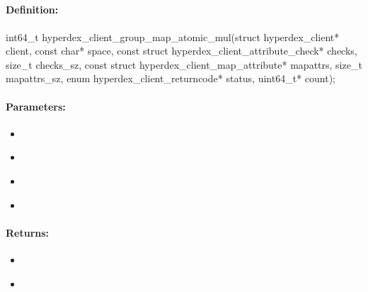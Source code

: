 \pagebreak
\subsection{}
\label{api:c:group_map_atomic_mul}


\paragraph{Definition:}
\begin{ccode}
int64_t hyperdex_client_group_map_atomic_mul(struct hyperdex_client* client,
        const char* space,
        const struct hyperdex_client_attribute_check* checks, size_t checks_sz,
        const struct hyperdex_client_map_attribute* mapattrs, size_t mapattrs_sz,
        enum hyperdex_client_returncode* status,
        uint64_t* count);
\end{ccode}

\paragraph{Parameters:}
\begin{itemize}[noitemsep]
\item {}\\

\item {}\\

\item {}\\

\item {}\\

\end{itemize}

\paragraph{Returns:}
\begin{itemize}[noitemsep]
\item {}\\

\item {}\\

\end{itemize}

